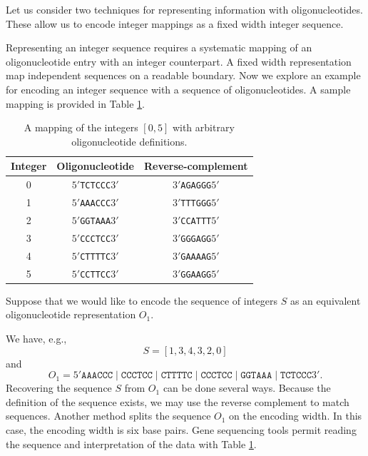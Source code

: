 Let us consider two techniques for representing information with oligonucleotides.  These allow us to encode integer mappings as a fixed width integer sequence.

Representing an integer sequence requires a systematic mapping of an oligonucleotide entry with an integer counterpart.  A fixed width representation map independent sequences on a readable boundary.  Now we explore an example for encoding an integer sequence with a sequence of oligonucleotides.  A sample mapping is provided in Table \ref{integer2OligoTable}.

\begin{table}[htdp]
\caption{A mapping of the integers $[0,5]$ with arbitrary oligonucleotide definitions.}
\begin{center}
\begin{tabular}{|c|c|c|}
\hline
 \textbf{Integer} & \textbf{Oligonucleotide} & \textbf{Reverse-complement}\\ \hline
0 & $5'$\texttt{TCTCCC}$3'$ & $3'$\texttt{AGAGGG}$5'$ \\
1 & $5'$\texttt{AAACCC}$3'$ & $3'$\texttt{TTTGGG}$5'$ \\
2 & $5'$\texttt{GGTAAA}$3'$ & $3'$\texttt{CCATTT}$5'$ \\
3 & $5'$\texttt{CCCTCC}$3'$ & $3'$\texttt{GGGAGG}$5'$ \\
4 & $5'$\texttt{CTTTTC}$3'$ & $3'$\texttt{GAAAAG}$5'$ \\
5 & $5'$\texttt{CCTTCC}$3'$ & $3'$\texttt{GGAAGG}$5'$ \\ \hline
\end{tabular}
\end{center}
\label{integer2OligoTable}
\end{table}%

Suppose that we would like to encode the sequence of integers $S$ as an equivalent oligonucleotide representation $O_1$.

We have, e.g., 
\[
S = [1, 3, 4, 3, 2, 0]
\]
and 
\[
O_1 = 5'\texttt{AAACCC}\mid \texttt{CCCTCC}\mid \texttt{CTTTTC}\mid \texttt{CCCTCC}\mid \texttt{GGTAAA}\mid \texttt{TCTCCC}3'.
\]
Recovering the sequence $S$ from $O_1$ can be done several ways.  Because the definition of the sequence exists, we may use the reverse complement to match sequences.  Another method splits the sequence $O_1$ on the encoding width.  In this case, the encoding width is six base pairs.  Gene sequencing tools permit reading the sequence and interpretation of the data with Table \ref{integer2OligoTable}.

